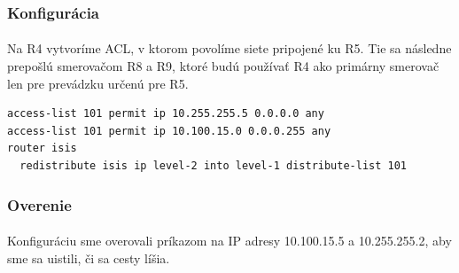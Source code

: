\documentclass[12pt,twoside,a4paper]{report}
\begin{document}
\subsubsection{Konfigurácia}
\paragraph{}
Na R4 vytvoríme ACL, v ktorom povolíme siete pripojené ku R5. Tie sa následne prepošlú smerovačom R8 a R9, ktoré budú používať R4 ako primárny smerovač len pre prevádzku určenú pre R5.

\noindent
{\selectfont
\begin{small}
\begin{verbatim}
access-list 101 permit ip 10.255.255.5 0.0.0.0 any
access-list 101 permit ip 10.100.15.0 0.0.0.255 any
router isis
  redistribute isis ip level-2 into level-1 distribute-list 101

\end{verbatim}
\end{small}
}

\subsubsection{Overenie}
\paragraph{}
Konfiguráciu sme overovali príkazom  na IP adresy 10.100.15.5 a 10.255.255.2, aby sme sa uistili, či sa cesty líšia.
\end{document}

